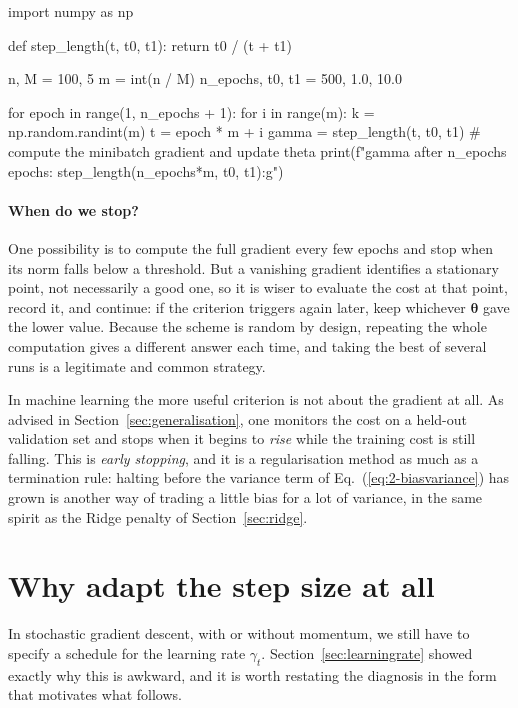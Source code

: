 \begin{Python}{}
import numpy as np

def step_length(t, t0, t1):
    return t0 / (t + t1)

n, M = 100, 5
m = int(n / M)
n_epochs, t0, t1 = 500, 1.0, 10.0

for epoch in range(1, n_epochs + 1):
    for i in range(m):
        k = np.random.randint(m)
        t = epoch * m + i
        gamma = step_length(t, t0, t1)
        # compute the minibatch gradient and update theta
print(f"gamma after {n_epochs} epochs: {step_length(n_epochs*m, t0, t1):g}")
\end{Python}

\paragraph{When do we stop?}
One possibility is to compute the full gradient every few epochs and stop when
its norm falls below a threshold.  But a vanishing gradient identifies a
stationary point, not necessarily a good one, so it is wiser to evaluate the
cost at that point, record it, and continue: if the criterion triggers again
later, keep whichever $\bm{\theta}$ gave the lower value.  Because the scheme
is random by design, repeating the whole computation gives a different answer
each time, and taking the best of several runs is a legitimate and common
strategy.

In machine learning the more useful criterion is not about the gradient at
all.  As advised in Section~\ref{sec:generalisation}, one monitors the cost on
a held-out validation set and stops when it begins to \emph{rise} while the
training cost is still falling.  This is \emph{early stopping}, and it is a
regularisation method as much as a termination rule: halting before the
variance term of Eq.~(\ref{eq:2-biasvariance}) has grown is another way of
trading a little bias for a lot of variance, in the same spirit as the Ridge
penalty of Section~\ref{sec:ridge}.


\section{Why adapt the step size at all}
\label{sec:adaptive}

In stochastic gradient descent, with or without momentum, we still have to
specify a schedule for the learning rate $\gamma_t$.  Section~\ref{sec:learningrate}
showed exactly why this is awkward, and it is worth restating the diagnosis in
the form that motivates what follows.

